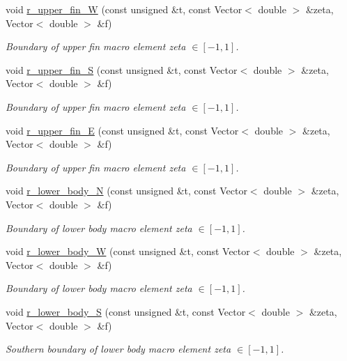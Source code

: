 \begin{DoxyCompactItemize}
void \hyperlink{classoomph_1_1FishDomain_a750c0daa893d08038a52fbf20a4b23b8}{r\+\_\+upper\+\_\+fin\+\_\+W} (const unsigned \&t, const Vector$<$ double $>$ \&zeta, Vector$<$ double $>$ \&f)
\begin{DoxyCompactList}\small\item\em Boundary of upper fin macro element zeta $ \in [-1,1] $. \end{DoxyCompactList}\item 
void \hyperlink{classoomph_1_1FishDomain_acd62f651648d85a79e04ced3193c3a2a}{r\+\_\+upper\+\_\+fin\+\_\+S} (const unsigned \&t, const Vector$<$ double $>$ \&zeta, Vector$<$ double $>$ \&f)
\begin{DoxyCompactList}\small\item\em Boundary of upper fin macro element zeta $ \in [-1,1] $. \end{DoxyCompactList}\item 
void \hyperlink{classoomph_1_1FishDomain_a063912bd40138bb84b3cdfc23133eff2}{r\+\_\+upper\+\_\+fin\+\_\+E} (const unsigned \&t, const Vector$<$ double $>$ \&zeta, Vector$<$ double $>$ \&f)
\begin{DoxyCompactList}\small\item\em Boundary of upper fin macro element zeta $ \in [-1,1] $. \end{DoxyCompactList}\item 
void \hyperlink{classoomph_1_1FishDomain_a75131ac72e23d5b1d701b588c0596b5d}{r\+\_\+lower\+\_\+body\+\_\+N} (const unsigned \&t, const Vector$<$ double $>$ \&zeta, Vector$<$ double $>$ \&f)
\begin{DoxyCompactList}\small\item\em Boundary of lower body macro element zeta $ \in [-1,1] $. \end{DoxyCompactList}\item 
void \hyperlink{classoomph_1_1FishDomain_a4466e68eb38c1e931743db93af2e9ba9}{r\+\_\+lower\+\_\+body\+\_\+W} (const unsigned \&t, const Vector$<$ double $>$ \&zeta, Vector$<$ double $>$ \&f)
\begin{DoxyCompactList}\small\item\em Boundary of lower body macro element zeta $ \in [-1,1] $. \end{DoxyCompactList}\item 
void \hyperlink{classoomph_1_1FishDomain_aa33b19ceef5cd574ee0a6756bcfc6da7}{r\+\_\+lower\+\_\+body\+\_\+S} (const unsigned \&t, const Vector$<$ double $>$ \&zeta, Vector$<$ double $>$ \&f)
\begin{DoxyCompactList}\small\item\em Southern boundary of lower body macro element zeta $\in [-1,1] $. \end{DoxyCompactList}\item 

\end{DoxyCompactItemize}
